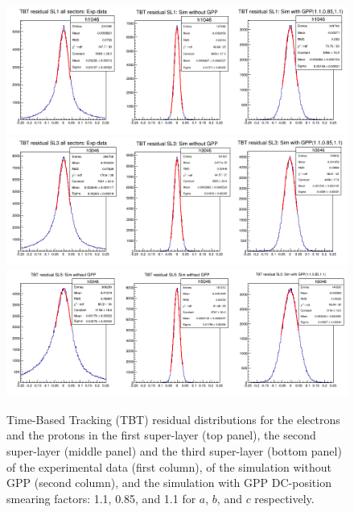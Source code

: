 \begin{figure}[tbp]
\centering
\includegraphics[scale=0.47]{fig_simulation/Ele_SL1.png}
\includegraphics[scale=0.47]{fig_simulation/Ele_SL3.png}
\includegraphics[scale=0.47]{fig_simulation/Ele_SL5.png}
\caption{Time-Based Tracking (TBT) residual distributions for the electrons and the protons in the first super-layer (top panel), the second super-layer (middle panel) and the third super-layer (bottom panel) of the experimental data (first column), of the simulation without GPP (second column), and the simulation with GPP DC-position smearing factors: 1.1, 0.85, and 1.1 for $a$, $b$, and $c$ respectively. } 
\label{fig:DC_smearing_factors}
\end{figure}


